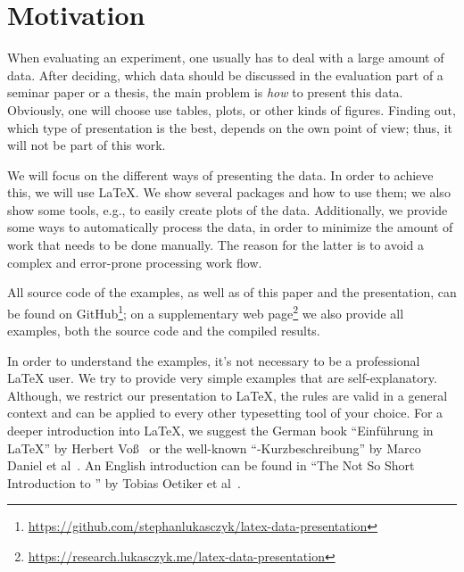 \section{Motivation}

When evaluating an experiment, one usually has to deal with a large amount of
data.  After deciding, which data should be discussed in the evaluation part of
a seminar paper or a thesis, the main problem is \emph{how} to present this
data. Obviously, one will choose use tables, plots, or other kinds of figures.
Finding out, which type of presentation is the best, depends on the own point of
view; thus, it will not be part of this work.

We will focus on the different ways of presenting the data.  In order to achieve
this, we will use \LaTeX\@.  We show several packages and how to use them; we
also show some tools, e.g., to easily create plots of the data.  Additionally,
we provide some ways to automatically process the data, in order to minimize the
amount of work that needs to be done manually.  The reason for the latter is to
avoid a complex and error-prone processing work flow.

All source code of the examples, as well as of this paper and the presentation,
can be found on GitHub\footnote{%
  \href{https://github.com/stephanlukasczyk/latex-data-presentation}%
    {https://github.com/stephanlukasczyk/latex-data-presentation}}; on a
supplementary web page\footnote{%
  \href{https://research.lukasczyk.me/latex-data-presentation}%
    {https://research.lukasczyk.me/latex-data-presentation}} we also provide all
examples, both the source code and the compiled results.

In order to understand the examples, it's not necessary to be a professional
\LaTeX{} user.  We try to provide very simple examples that are
self-explanatory.  Although, we restrict our presentation to \LaTeX{}, the rules
are valid in a general context and can be applied to every other typesetting
tool of your choice.  For a deeper introduction into \LaTeX{}, we suggest the
German book \enquote{Einführung in \LaTeX} by Herbert Voß~\cite{Voss2012} or the
well-known \enquote{-Kurzbeschreibung} by Marco Daniel et
al~\cite{Daniel2015}.  An English introduction can be found in \enquote{The Not
So Short Introduction to } by Tobias Oetiker et
al~\cite{Oetiker2015}.
